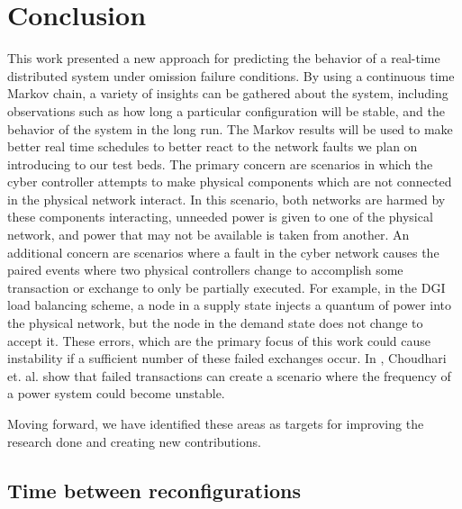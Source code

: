 \chapter{Conclusion}

This work presented a new approach for predicting the behavior of a real-time distributed system under omission failure conditions. By using a continuous time Markov chain, a variety of insights can be gathered about the system, including observations such as how long a particular configuration will be stable, and the behavior of the system in the long run.  The Markov results will be used  to make better real time schedules to better react to the network faults we plan on introducing to our test beds. The primary concern are scenarios in which the cyber controller attempts to make physical components which are not connected in the physical network interact. In this scenario, both networks are harmed by these components interacting, unneeded power is given to one of the physical network, and power that may not be available is taken from another. An additional concern are scenarios where a fault in the cyber network causes the paired events where two physical controllers change to accomplish some transaction or exchange to only be partially executed. For example, in the DGI load balancing scheme, a node in a supply state injects a quantum of power into the physical network, but the node in the demand state does not change to accept it. These errors, which are the primary focus of this work could cause instability if a sufficient number of these failed exchanges occur. In \cite{HARINI}, Choudhari et. al. show that failed transactions can create a scenario where the frequency of a power system could become unstable. 

Moving forward, we have identified these areas as targets for improving the research done and creating new contributions.

\section{Time between reconfigurations}

